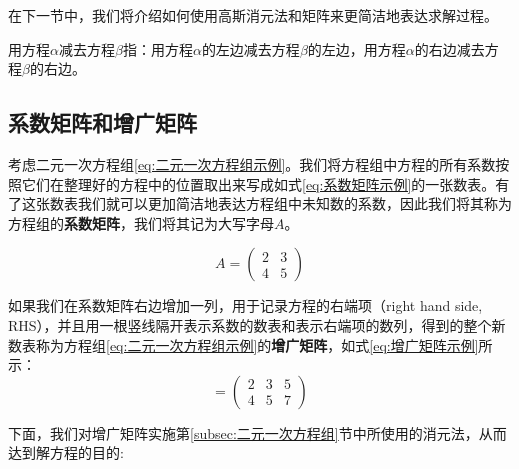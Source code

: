 \documentclass[lang=cn,newtx,10pt,scheme=chinese]{elegantbook}
\begin{document}
在下一节中，我们将介绍如何使用高斯消元法和矩阵来更简洁地表达求解过程。

\vspace{0.5cm}

\begin{note}
    用方程$\alpha$减去方程$\beta$指：用方程$\alpha$的左边减去方程$\beta$的左边，用方程$\alpha$的右边减去方程$\beta$的右边。
\end{note}

\subsection{系数矩阵和增广矩阵}
\label{subsec:系数矩阵和增广矩阵}

考虑二元一次方程组\ref{eq:二元一次方程组示例}。我们将方程组中方程的所有系数按照它们在整理好的方程中的位置取出来写成如式\ref{eq:系数矩阵示例}的一张数表。有了这张数表我们就可以更加简洁地表达方程组中未知数的系数，因此我们将其称为方程组的\textcolor{third}{\bf 系数矩阵}，我们将其记为大写字母$A$。

\begin{equation}
  A = \left(\begin{array}{ll}
2 & 3 \\
4 & 5
\end{array}\right)
\label{eq:系数矩阵示例}
\end{equation}

如果我们在系数矩阵右边增加一列，用于记录方程的右端项（right hand side, RHS），并且用一根竖线隔开表示系数的数表和表示右端项的数列，得到的整个新数表称为方程组\ref{eq:二元一次方程组示例}的\textcolor{third}{\bf 增广矩阵}，如式\ref{eq:增广矩阵示例}所示：
\begin{equation}
    [A \mid B]=\left(\begin{array}{cc|c}
2 & 3 & 5 \\
4 & 5 & 7
\end{array}\right)
\label{eq:增广矩阵示例}
\end{equation}

下面，我们对增广矩阵实施第\ref{subsec:二元一次方程组}节中所使用的消元法，从而达到解方程的目的:
\end{document}
